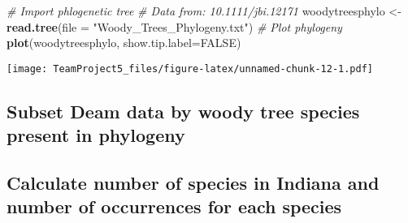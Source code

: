 \documentclass[
]{article}
\newenvironment{Shaded}{\begin{snugshade}}{\end{snugshade}}
\newcommand{\CommentTok}[1]{\textcolor[rgb]{0.56,0.35,0.01}{\textit{#1}}}
\newcommand{\DataTypeTok}[1]{\textcolor[rgb]{0.13,0.29,0.53}{#1}}
\newcommand{\DecValTok}[1]{\textcolor[rgb]{0.00,0.00,0.81}{#1}}
\newcommand{\KeywordTok}[1]{\textcolor[rgb]{0.13,0.29,0.53}{\textbf{#1}}}
\newcommand{\NormalTok}[1]{#1}
\newcommand{\OperatorTok}[1]{\textcolor[rgb]{0.81,0.36,0.00}{\textbf{#1}}}
\newcommand{\OtherTok}[1]{\textcolor[rgb]{0.56,0.35,0.01}{#1}}
\newcommand{\StringTok}[1]{\textcolor[rgb]{0.31,0.60,0.02}{#1}}
\begin{document}
\begin{Shaded}
\begin{Highlighting}[]
\CommentTok{# Import phlogenetic tree}
\CommentTok{# Data from: 10.1111/jbi.12171}
\NormalTok{woodytreesphylo <-}\StringTok{ }\KeywordTok{read.tree}\NormalTok{(}\DataTypeTok{file =} \StringTok{"Woody_Trees_Phylogeny.txt"}\NormalTok{)}
\CommentTok{# Plot phylogeny}
\KeywordTok{plot}\NormalTok{(woodytreesphylo, }\DataTypeTok{show.tip.label=}\OtherTok{FALSE}\NormalTok{)}
\end{Highlighting}
\end{Shaded}

\texttt{[image: TeamProject5\_files/figure-latex/unnamed-chunk-12-1.pdf]}

\hypertarget{subset-deam-data-by-woody-tree-species-present-in-phylogeny}{%
\subsection{Subset Deam data by woody tree species present in
phylogeny}\label{subset-deam-data-by-woody-tree-species-present-in-phylogeny}}

\begin{Shaded}
\end{Shaded}

\hypertarget{calculate-number-of-species-in-indiana-and-number-of-occurrences-for-each-species}{%
\subsection{Calculate number of species in Indiana and number of
occurrences for each
species}\label{calculate-number-of-species-in-indiana-and-number-of-occurrences-for-each-species}}
\end{document}
